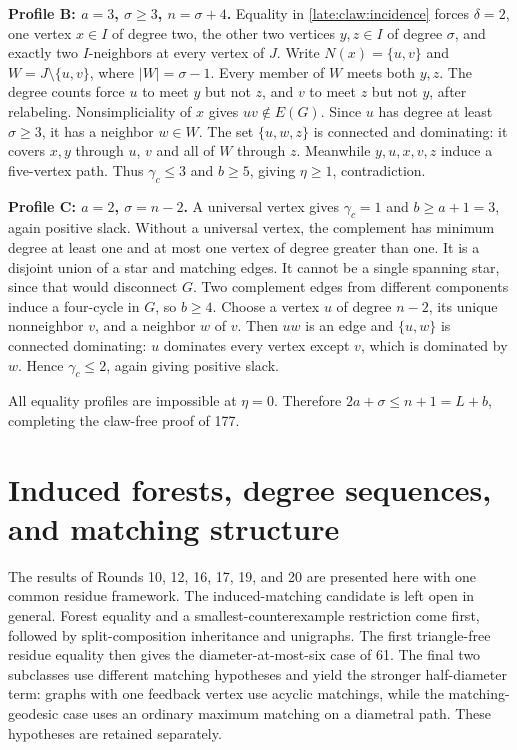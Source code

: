 \documentclass[11pt,a4paper]{article}
\theoremstyle{definition}\newtheorem{definition}[theorem]{Definition}
\theoremstyle{remark}\newtheorem{remark}[theorem]{Remark}
\begin{document}
\textbf{Profile B: \(a=3\), \(\sigma\ge3\), \(n=\sigma+4\).} Equality in
\eqref{late:claw:incidence} forces \(\delta=2\), one vertex \(x\in I\) of degree two, the other
two vertices \(y,z\in I\) of degree \(\sigma\), and exactly two
\(I\)-neighbors at every vertex of \(J\). Write \(N(x)=\{u,v\}\) and
\(W=J\setminus\{u,v\}\), where \(|W|=\sigma-1\). Every member of \(W\)
meets both \(y,z\). The degree counts force \(u\) to meet \(y\) but not
\(z\), and \(v\) to meet \(z\) but not \(y\), after relabeling.
Nonsimpliciality of \(x\) gives \(uv\notin E(G)\). Since \(u\) has
degree at least \(\sigma\ge3\), it has a neighbor \(w\in W\). The set
\(\{u,w,z\}\) is connected and dominating: it covers \(x,y\) through
\(u\), \(v\) and all of \(W\) through \(z\). Meanwhile \(y,u,x,v,z\)
induce a five-vertex path. Thus \(\gamma_c\le3\) and \(b\ge5\), giving
\(\eta\ge1\), contradiction.

\textbf{Profile C: \(a=2\), \(\sigma=n-2\).} A universal vertex gives
\(\gamma_c=1\) and \(b\ge a+1=3\), again positive slack. Without a
universal vertex, the complement has minimum degree at least one and at
most one vertex of degree greater than one. It is a disjoint union of a
star and matching edges. It cannot be a single spanning star, since that
would disconnect \(G\). Two complement edges from different components
induce a four-cycle in \(G\), so \(b\ge4\). Choose a vertex \(u\) of
degree \(n-2\), its unique nonneighbor \(v\), and a neighbor \(w\) of
\(v\). Then \(uw\) is an edge and \(\{u,w\}\) is connected dominating:
\(u\) dominates every vertex except \(v\), which is dominated by \(w\).
Hence \(\gamma_c\le2\), again giving positive slack.

All equality profiles are impossible at \(\eta=0\). Therefore
\(2a+\sigma\le n+1=L+b\), completing the claw-free proof of 177.


\section{Induced forests, degree sequences, and matching structure}
\label{late:induced-forests}
The results of Rounds 10, 12, 16, 17, 19, and 20 are presented here with
one common residue framework. The induced-matching candidate is left
open in general. Forest equality and a smallest-counterexample
restriction come first, followed by split-composition inheritance and
unigraphs. The first triangle-free residue equality then gives the
diameter-at-most-six case of 61. The final two subclasses use different
matching hypotheses and yield the stronger half-diameter term: graphs
with one feedback vertex use acyclic matchings, while the
matching-geodesic case uses an ordinary maximum matching on a
diametral path. These hypotheses are retained separately.
\end{document}
